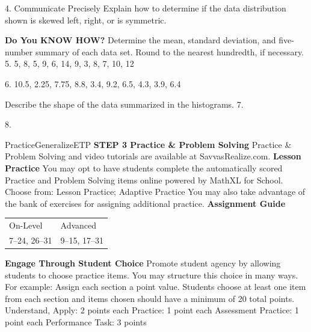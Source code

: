 \documentclass{article}
\newenvironment{concept-summary}{}{}    %
\newenvironment{te-addendum}[2]{}{}     %
\newcommand{\answer}[1]{}               %
\newcommand{\placeholder}[2]{}          %
\newcommand{\te}[1]{}                   %
\begin{document}
\begin{concept-summary}
4. Communicate Precisely Explain how to determine if the data distribution shown is skewed left, right, or is symmetric.
\placeholder{graph}{Blue narrow-bin histogram with no axis labels or numerical ticks. Very low bars on the left grow gradually into a broad high peak near the right; bars fall rapidly at the far right. Long left tail; no arrows.}
\answer{The data distribution is skewed left because the long tail of data values is on the left side of the distribution.}
\textbf{Do You KNOW HOW?}
Determine the mean, standard deviation, and five-number summary of each data set. Round to the nearest hundredth, if necessary.
5. 5, 8, 5, 9, 6, 14, 9, 3, 8, 7, 10, 12
\answer{mean: 8; standard deviation: (\approx2.97); minimum: 3; 1st quartile: 5.5; median: 8; 3rd quartile: 9.5; maximum: 14}
6. 10.5, 2.25, 7.75, 8.8, 3.4, 9.2, 6.5, 4.3, 3.9, 6.4
\answer{mean: 6.3; standard deviation: (\approx2.63); minimum: 2.25; 1st quartile: 3.9; median: 6.45; 3rd quartile: 8.8; maximum: 10.5}
Describe the shape of the data summarized in the histograms.
7.
\placeholder{graph}{Orange histogram, horizontal bin centers 1 through 9, vertical ticks 0,2,4,6,8, no axis titles or arrows. Bar heights 1,1,3,5,7,6,1,2,1. Approximately symmetric with central peak near 5.}
\answer{The data are symmetric and approximately normally distributed with a mean of about 5.}
8.
\placeholder{graph}{Orange histogram, horizontal bin centers 1 through 10, vertical ticks 0 through 5 at unit increments, no axis titles or arrows. Approximate heights 1.5,3.7,4.6,3.6,1.5,.8,.5,.3,.25,.2. Long right tail.}
\answer{The data distribution is skewed right (positive) because the long tail of the data values is on the right side of the distribution.}
\end{concept-summary}
\begin{te-addendum}{Practice}{GeneralizeETP}
\textbf{STEP 3 Practice & Problem Solving}
Practice \& Problem Solving and video tutorials are available at SavvasRealize.com.
\textbf{Lesson Practice} You may opt to have students complete the automatically scored Practice and Problem Solving items online powered by MathXL for School.
Choose from: Lesson Practice; Adaptive Practice
You may also take advantage of the bank of exercises for assigning additional practice.
\textbf{Assignment Guide}
\begin{tabular}{ll}
On-Level & Advanced \\
7–24, 26–31 & 9–15, 17–31 \\
\end{tabular}
\textbf{Engage Through Student Choice}
Promote student agency by allowing students to choose practice items. You may structure this choice in many ways. For example:
Assign each section a point value. Students choose at least one item from each section and items chosen should have a minimum of 20 total points.
Understand, Apply: 2 points each
Practice: 1 point each
Assessment Practice: 1 point each
Performance Task: 3 points
\te{Scan the QR code to access a video tutorial.}
\end{te-addendum}
\end{document}
